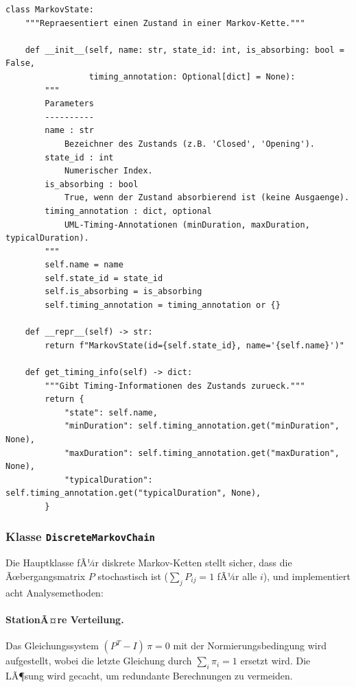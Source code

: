 ﻿\documentclass[a4paper,12pt]{scrreprt}
\theoremstyle{definition}
\begin{document}
\begin{lstlisting}[style=python, caption={MarkovState: Zustand mit MARTE-konformen Timing-Annotationen}, label=lst:markovstate]
class MarkovState:
    """Repraesentiert einen Zustand in einer Markov-Kette."""

    def __init__(self, name: str, state_id: int, is_absorbing: bool = False,
                 timing_annotation: Optional[dict] = None):
        """
        Parameters
        ----------
        name : str
            Bezeichner des Zustands (z.B. 'Closed', 'Opening').
        state_id : int
            Numerischer Index.
        is_absorbing : bool
            True, wenn der Zustand absorbierend ist (keine Ausgaenge).
        timing_annotation : dict, optional
            UML-Timing-Annotationen (minDuration, maxDuration, typicalDuration).
        """
        self.name = name
        self.state_id = state_id
        self.is_absorbing = is_absorbing
        self.timing_annotation = timing_annotation or {}

    def __repr__(self) -> str:
        return f"MarkovState(id={self.state_id}, name='{self.name}')"

    def get_timing_info(self) -> dict:
        """Gibt Timing-Informationen des Zustands zurueck."""
        return {
            "state": self.name,
            "minDuration": self.timing_annotation.get("minDuration", None),
            "maxDuration": self.timing_annotation.get("maxDuration", None),
            "typicalDuration": self.timing_annotation.get("typicalDuration", None),
        }
\end{lstlisting}

\subsubsection{Klasse \texttt{DiscreteMarkovChain}}

Die Hauptklasse fÃ¼r diskrete Markov-Ketten stellt sicher, dass die
Ãœbergangsmatrix $P$ stochastisch ist ($\sum_j P_{ij} = 1$ fÃ¼r alle $i$),
und implementiert acht Analysemethoden:

\paragraph{StationÃ¤re Verteilung.}
Das Gleichungssystem $(P^T - I)\,\pi = 0$ mit der Normierungsbedingung
wird aufgestellt, wobei die letzte Gleichung durch $\sum_i \pi_i = 1$
ersetzt wird. Die LÃ¶sung wird gecacht, um redundante Berechnungen zu vermeiden.
\end{document}
